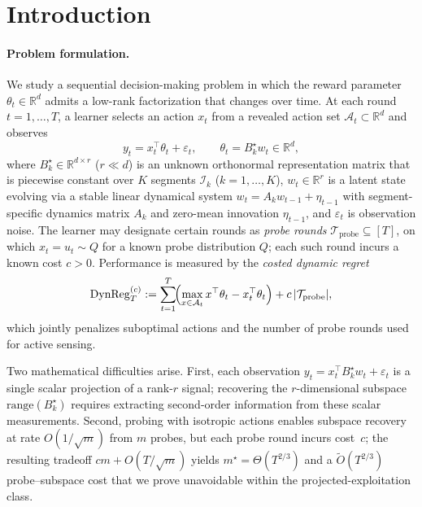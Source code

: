 \documentclass[11pt]{article}
\newcommand{\R}{\mathbb{R}}
\newcommand{\cA}{\mathcal{A}}
\newcommand{\cI}{\mathcal{I}}
\newcommand{\cTprobe}{\mathcal{T}_{\mathrm{probe}}}
\newcommand{\DynReg}{\mathrm{DynReg}}
\newcommand{\range}{\mathrm{range}}
\begin{document}
\section{Introduction}
\label{sec:intro}

\paragraph{Problem formulation.}
We study a sequential decision-making problem in which the reward parameter
$\theta_t\in\R^d$ admits a low-rank factorization that changes over time.
At each round $t=1,\ldots,T$, a learner selects an action $x_t$ from a revealed
action set $\cA_t\subset\R^d$ and observes
\begin{equation}
  y_t = x_t^\top \theta_t + \varepsilon_t,\qquad
  \theta_t = B_k^\star w_t \in \R^d,
  \label{eq:intro_model}
\end{equation}
where $B_k^\star\in\R^{d\times r}$ ($r\ll d$) is an unknown orthonormal
representation matrix that is piecewise constant over $K$ segments
$\cI_k$ ($k=1,\ldots,K$), $w_t\in\R^r$ is a latent state evolving via a
stable linear dynamical system $w_t = A_k w_{t-1}+\eta_{t-1}$ with
segment-specific dynamics matrix $A_k$ and zero-mean innovation $\eta_{t-1}$,
and $\varepsilon_t$ is observation noise.
The learner may designate certain rounds as \emph{probe rounds}
$\cTprobe\subseteq[T]$, on which $x_t=u_t\sim Q$ for a known probe distribution
$Q$; each such round incurs a known cost $c>0$.
Performance is measured by the \emph{costed dynamic regret}
\begin{equation}
  \DynReg_T^{(c)} := \sum_{t=1}^T\!\Bigl(\max_{x\in\cA_t}x^\top\theta_t
  - x_t^\top\theta_t\Bigr) + c\,|\cTprobe|,
  \label{eq:intro_regret}
\end{equation}
which jointly penalizes suboptimal actions and the number of probe rounds
used for active sensing.

Two mathematical difficulties arise.
First, each observation $y_t = x_t^\top B_k^\star w_t + \varepsilon_t$ is a single
scalar projection of a rank-$r$ signal; recovering the $r$-dimensional subspace
$\range(B_k^\star)$ requires extracting second-order information from these scalar
measurements.
Second, probing with isotropic actions enables subspace recovery at rate
$O(1/\sqrt{m})$ from $m$ probes, but each probe round incurs cost~$c$; the resulting
tradeoff $cm + O(T/\sqrt{m})$ yields $m^\star = \Theta(T^{2/3})$ and a
$\widetilde{O}(T^{2/3})$ probe--subspace cost that we prove unavoidable within the
projected-exploitation class.
\end{document}
